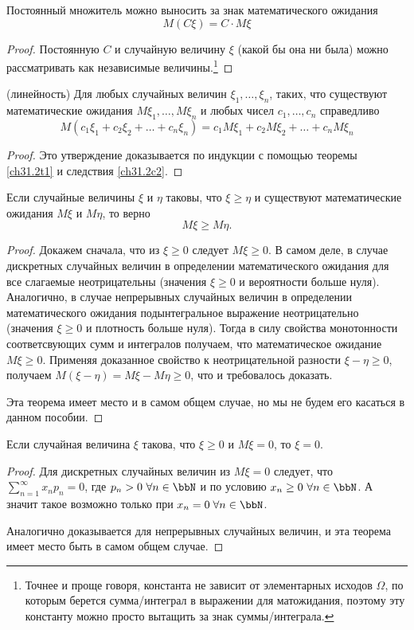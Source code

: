 \begin{cons}\label{ch31.2c2}
Постоянный множитель можно выносить за знак математического ожидания
$$
M(C\xi)=C\cdot M\xi
$$
\end{cons}
\begin{proof}
Постоянную $C$ и случайную величину $\xi$ (какой бы она ни была) можно рассматривать как независимые величины.\footnote{Точнее и проще говоря, константа не зависит от элементарных исходов $\Omega$, по которым берется сумма/интеграл в выражении для матожидания, поэтому эту константу можно просто вытащить за знак суммы/интеграла.}
\end{proof}
\begin{cons}(линейность) Для любых случайных величин $\xi_1,\dots,\xi_n$, таких, что существуют математические ожидания $M\xi_1,\dots, M\xi_n$ и любых чисел $c_1,\dots, c_n$ справедливо
$$
M(c_1\xi_1+c_2\xi_2+\dots+c_n\xi_n) = c_1M\xi_1+c_2M\xi_2+\dots+c_nM\xi_n
$$
\end{cons}
\begin{proof} Это утверждение доказывается по индукции с помощью теоремы \ref{ch31.2t1} и следствия \ref{ch31.2c2}.
\end{proof}
\begin{thm}[монотонность] \label{ch31.2t4}
Если случайные величины $\xi$ и $\eta$ таковы, что $\xi \ge\eta$ и существуют математические ожидания $M\xi$ и $M\eta$, то верно
$$
M\xi\ge M\eta.
$$
\end{thm}
\begin{proof}
Докажем сначала, что из $\xi\ge 0$ следует $M\xi\ge0$. В самом деле, в случае дискретных случайных величин в определении математического ожидания для все слагаемые неотрицательны (значения $\xi \ge 0$ и вероятности больше нуля). Аналогично, в случае непрерывных случайных величин в определении математического ожидания подынтегральное выражение неотрицательно (значения $\xi \ge 0$ и плотность больше нуля). Тогда в силу свойства монотонности соответсвующих сумм и интегралов получаем, что математическое ожидание $M\xi \ge 0$. Применяя доказанное свойство к неотрицательной разности $\xi-\eta \ge 0$, получаем $M(\xi-\eta)=M\xi-M\eta\ge0$, что и требовалось доказать.

Эта теорема имеет место и в самом общем случае, но мы не будем его касаться в данном пособии.
\end{proof}
\begin{thm}\label{ch31.2t3}
Если случайная величина $\xi$ такова, что $\xi\ge 0$ и $M\xi=0$, то $\xi=0$.
\end{thm}
\begin{proof}
Для дискретных случайных величин из $M\xi=0$ следует, что $\sum\limits_{n=1}^{\infty} x_n p_n = 0$, где $p_n > 0 \ \forall n\in \bbN$ и по условию $x_n \ge 0 \ \forall n\in \bbN$. А значит такое возможно только при $x_n = 0 \; \forall n\in \bbN$.

Аналогично доказывается для непрерывных случайных величин, и эта теорема имеет место быть в самом общем случае.
\end{proof}


